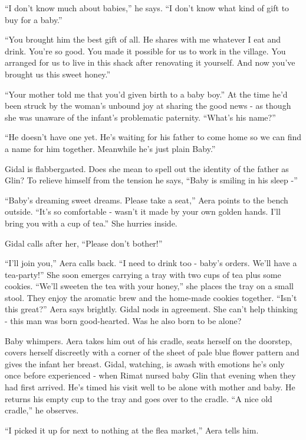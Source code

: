 \documentclass[twoside,11pt]{book}
\begin{document}
 ``I don't know much about babies,'' he says. ``I don't know what kind of gift
to buy for a baby.''

``You brought him the best gift of all. He shares with me whatever I eat and drink. You're so good. You
made it possible for us to work in the village. You arranged for us to live
in this shack after renovating it yourself. And now you've brought us this sweet honey.''

``Your mother told me that you'd given birth to a baby
boy.'' At the time he'd been struck by the woman's unbound joy at sharing the good news - as though she
was unaware of the infant's problematic paternity. ``What's his name?''

``He doesn't have one yet. He's waiting for his father to come home so we can find a name for him together.
Meanwhile he's just plain Baby.''

Gidal is flabbergasted. Does she mean to spell out the identity of the father as Glin? To relieve himself from the
tension he says, ``Baby is smiling in his sleep -''

``Baby's dreaming sweet dreams. Please take a seat,'' Aera points to the bench
outside. ``It's so comfortable - wasn't it made by your own
golden hands. I'll bring you with a cup of tea.'' She hurries inside.

Gidal calls after her, ``Please don't bother!''


\bigskip

``I'll join you,'' Aera calls back. ``I need to drink too - baby's orders. We'll
have a tea-party!'' She soon emerges carrying a tray with two cups of tea plus some cookies.
``We'll sweeten the tea with your honey,'' she
places the tray on a small stool. They enjoy the aromatic brew and the home-made cookies together.
``Isn't this great?'' Aera says brightly. Gidal nods in agreement. She can't help thinking -
this man was born good-hearted. Was he also born to be alone?

Baby whimpers. Aera takes him out of his cradle, seats herself on the doorstep, covers herself
 discreetly with a corner of the
sheet of pale blue flower pattern and gives the infant her breast. Gidal, watching, is awash with
emotions he's only once before experienced - when Rimat nursed baby Glin that evening when they had
first arrived. He's timed his visit well to be alone with mother and baby. He returns his empty cup to the tray and
goes over to the cradle. ``A nice old cradle,'' he
observes.

``I picked it up for next to nothing at the flea market,'' Aera tells
him.
\end{document}
